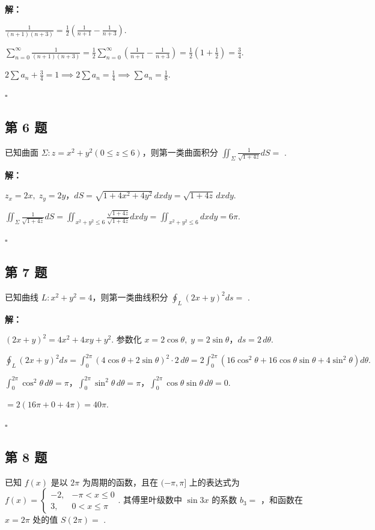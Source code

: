 \documentclass[12pt,a4paper]{article}
\newenvironment{sol}[1][解]{%
  \par\medskip\noindent\textbf{#1：}\itshape\par\noindent\ignorespaces
}{%
  \par\hfill$\square$\par\medskip
}
\begin{document}
\begin{sol}$\frac{1}{(n+1)(n+3)}=\frac{1}{2}\left(\frac{1}{n+1}-\frac{1}{n+3}\right)$.

  $\sum_{n=0}^{\infty}\frac{1}{(n+1)(n+3)}=\frac{1}{2}\sum_{n=0}^{\infty}\left(\frac{1}{n+1}-\frac{1}{n+3}\right)=\frac{1}{2}(1+\frac{1}{2})=\frac{3}{4}.$

  $2\sum a_n+\frac{3}{4}=1\implies 2\sum a_n=\frac{1}{4}\implies\sum
  a_n=\frac{1}{8}.$

\end{sol}
\subsection*{第 6 题}
已知曲面 $\Sigma: z=x^2+y^2 (0\le z\le 6)$，则第一类曲面积分
$\iint_{\Sigma}\frac{1}{\sqrt{1+4z}}dS=$ \underline{\qquad\qquad}.

\begin{sol}$z_x=2x,\;
  z_y=2y$，$dS=\sqrt{1+4x^2+4y^2}\,dxdy=\sqrt{1+4z}\,dxdy$.

  $\iint_{\Sigma}\frac{1}{\sqrt{1+4z}}dS=\iint_{x^2+y^2\le
  6}\frac{\sqrt{1+4z}}{\sqrt{1+4z}}dxdy=\iint_{x^2+y^2\le 6}dxdy=6\pi.$

\end{sol}
\subsection*{第 7 题}
已知曲线 $L: x^2+y^2=4$，则第一类曲线积分 $\oint_{L}(2x+y)^2ds=$ \underline{\qquad\qquad}.

\begin{sol}$(2x+y)^2=4x^2+4xy+y^2$. 参数化 $x=2\cos\theta,\;
  y=2\sin\theta$，$ds=2\,d\theta$.

  $\oint_L(2x+y)^2ds=\int_0^{2\pi}(4\cos\theta+2\sin\theta)^2\cdot
  2\,d\theta=2\int_0^{2\pi}(16\cos^2\theta+16\cos\theta\sin\theta+4\sin^2\theta)d\theta.$

  $\int_0^{2\pi}\cos^2\theta\,d\theta=\pi$，$\int_0^{2\pi}\sin^2\theta\,d\theta=\pi$，$\int_0^{2\pi}\cos\theta\sin\theta\,d\theta=0$.

  $=2(16\pi+0+4\pi)=40\pi.$

\end{sol}
\subsection*{第 8 题}
已知 $f(x)$ 是以 $2\pi$ 为周期的函数，且在 $(-\pi, \pi]$ 上的表达式为 $f(x)=
\begin{cases}-2, & -\pi<x\le 0 \\ 3, & 0<x\le \pi
\end{cases}$. 其傅里叶级数中 $\sin 3x$ 的系数 $b_3=$
\underline{\qquad\qquad}，和函数在 $x=2\pi$ 处的值 $S(2\pi)=$ \underline{\qquad\qquad}.
\end{document}
